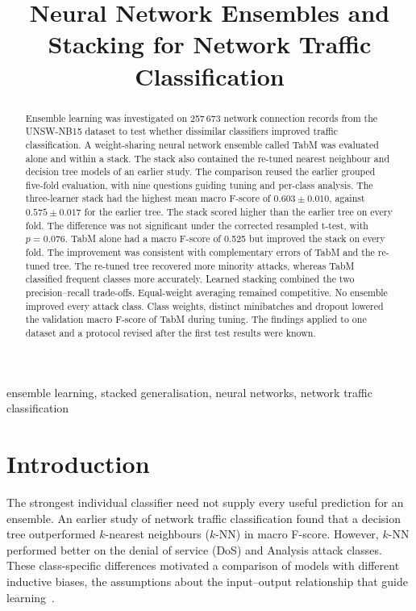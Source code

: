\documentclass[conference]{IEEEtran}
\newcommand{\knn}{\mbox{$k$-NN}}
\begin{document}
\raggedbottom
\title{Neural Network Ensembles and Stacking for Network Traffic Classification}
\author{}
\maketitle

\begin{abstract}
    Ensemble learning was investigated on 257\,673 network connection records from the UNSW-NB15 dataset to test whether dissimilar classifiers improved traffic classification. A weight-sharing neural network ensemble called TabM was evaluated alone and within a stack. The stack also contained the re-tuned nearest neighbour and decision tree models of an earlier study. The comparison reused the earlier grouped five-fold evaluation, with nine questions guiding tuning and per-class analysis. The three-learner stack had the highest mean macro F-score of $0.603 \pm 0.010$, against $0.575 \pm 0.017$ for the earlier tree. The stack scored higher than the earlier tree on every fold. The difference was not significant under the corrected resampled t-test, with $p = 0.076$. TabM alone had a macro F-score of 0.525 but improved the stack on every fold. The improvement was consistent with complementary errors of TabM and the re-tuned tree. The re-tuned tree recovered more minority attacks, whereas TabM classified frequent classes more accurately. Learned stacking combined the two precision--recall trade-offs. Equal-weight averaging remained competitive. No ensemble improved every attack class. Class weights, distinct minibatches and dropout lowered the validation macro F-score of TabM during tuning. The findings applied to one dataset and a protocol revised after the first test results were known.

\end{abstract}

\begin{IEEEkeywords}
    ensemble learning, stacked generalisation, neural networks, network traffic classification
\end{IEEEkeywords}

\section{Introduction}
The strongest individual classifier need not supply every useful prediction for an ensemble. An earlier study of network traffic classification found that a decision tree outperformed $k$-nearest neighbours (\knn) in macro F-score. However, \knn{} performed better on the denial of service (DoS) and Analysis attack classes. These class-specific differences motivated a comparison of models with different inductive biases, the assumptions about the input--output relationship that guide learning~\cite{mitchell1997}.
\end{document}
